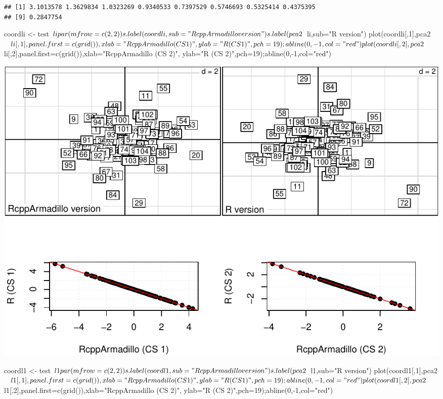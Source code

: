 \documentclass[
  10pt,
]{article}
\newenvironment{Shaded}{\begin{snugshade}}{\end{snugshade}}
\newcommand{\NormalTok}[1]{#1}
\begin{document}
\begin{Shaded}
\end{Shaded}

\begin{verbatim}
## [1] 3.1013578 1.3629834 1.0323269 0.9340533 0.7397529 0.5746693 0.5325414 0.4375395
## [9] 0.2847754
\end{verbatim}

\begin{Shaded}
\begin{Highlighting}[]
\NormalTok{coordli \textless{}{-} test$li}
\NormalTok{par(mfrow=c(2,2))}
\NormalTok{s.label(coordli,sub="RcppArmadillo version")}
\NormalTok{s.label(pca2$li,sub="R version")}
\NormalTok{plot(coordli[,1],pca2$li[,1],panel.first=c(grid()),xlab="RcppArmadillo (CS 1)",}
\NormalTok{     ylab="R (CS 1)",pch=19);abline(0,{-}1,col="red")}
\NormalTok{plot(coordli[,2],pca2$li[,2],panel.first=c(grid()),xlab="RcppArmadillo (CS 2)",}
\NormalTok{     ylab="R (CS 2)",pch=19);abline(0,{-}1,col="red")}
\end{Highlighting}
\end{Shaded}

\includegraphics{RandPytonAnalysisPDF_files/figure-latex/unnamed-chunk-50-1.pdf}

\begin{Shaded}
\begin{Highlighting}[]
\NormalTok{coordl1 \textless{}{-} test$l1}
\NormalTok{par(mfrow=c(2,2))}
\NormalTok{s.label(coordl1,sub="RcppArmadillo version")}
\NormalTok{s.label(pca2$l1,sub="R version")}
\NormalTok{plot(coordl1[,1],pca2$l1[,1],panel.first=c(grid()),xlab="RcppArmadillo (CS 1)",}
\NormalTok{     ylab="R (CS 1)",pch=19);abline(0,{-}1,col="red")}
\NormalTok{plot(coordl1[,2],pca2$l1[,2],panel.first=c(grid()),xlab="RcppArmadillo (CS 2)",}
\NormalTok{     ylab="R (CS 2)",pch=19);abline(0,{-}1,col="red")}
\end{Highlighting}
\end{Shaded}
\end{document}

